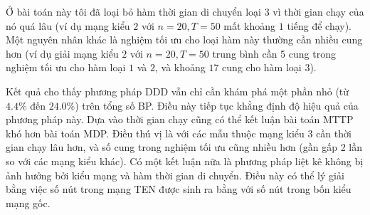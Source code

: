 \documentclass[../main.tex]{subfiles}
\begin{document}
Ở bài toán này tôi đã loại bỏ hàm thời gian di chuyển loại \(3\) vì thời
gian chạy của nó quá lâu (ví dụ mạng kiểu \(2\) với \(n=20, T=50\) mất
khoảng \(1\) tiếng để chạy). Một nguyên nhân khác là nghiệm tối ưu cho
loại hàm này thường cần nhiều cung hơn (ví dụ giải mạng kiểu \(2\) với
\(n=20, T=50\) trung bình cần 5 cung trong nghiệm tối ưu cho hàm loại
\(1\) và \(2\), và khoảng \(17\) cung cho hàm loại \(3\)).

Kết quả cho thấy phương pháp DDD vẫn chỉ cần khám phá một phần nhỏ (từ
\(4.4\%\) đến \(24.0\%\)) trên tổng số BP. Điều này tiếp tục khẳng định
độ hiệu quả của phương pháp này. Dựa vào thời gian chạy cũng có thể kết
luận bài toán MTTP khó hơn bài toán MDP. Điều thú vị là với các mẫu
thuộc mạng kiểu 3 cần thời gian chạy lâu hơn, và số cung trong nghiệm
tối ưu cũng nhiều hơn (gần gấp 2 lần so với các mạng kiểu khác). Có một
kết luận nữa là phương pháp liệt kê không bị ảnh hưởng bởi kiểu mạng và
hàm thời gian di chuyển. Điều này có thể lý giải bằng việc số nút trong
mạng TEN được sinh ra bằng với số nút trong bốn kiểu mạng gốc.
\backmatter
\end{document}
